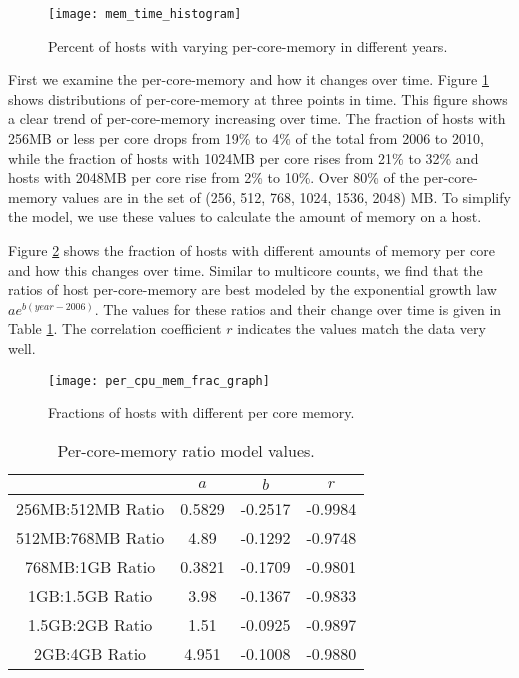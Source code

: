 \documentclass[conference]{IEEEtran}
\begin{document}
\begin{figure}[!t]
\centering
\texttt{[image: mem\_time\_histogram]}
\caption{Percent of hosts with varying per-core-memory in different years.}
\label{fig-mem-time-hist}
\end{figure}

First we examine the per-core-memory and how it changes over time.  Figure \ref{fig-mem-time-hist} shows distributions of per-core-memory at three points in time.  This figure shows a clear trend of per-core-memory increasing over time.  The fraction of hosts with 256MB or less per core drops from 19\% to 4\% of the total from 2006 to 2010, while the fraction of hosts with 1024MB per core rises from 21\% to 32\% and hosts with 2048MB per core rise from 2\% to 10\%.  Over 80\% of the per-core-memory values are in the set of (256, 512, 768, 1024, 1536, 2048) MB.  To simplify the model, we use these values to calculate the amount of memory on a host.

Figure \ref{fig-per-cpumem-frac-graph} shows the fraction of hosts with different amounts of memory per core and how this changes over time.  Similar to multicore counts, we find that the ratios of host per-core-memory are best modeled by the exponential growth law $a e^{b (year-2006)}$.  The values for these ratios and their change over time is given in Table \ref{mem-ratio-val-table}.  The correlation coefficient $r$ indicates the values match the data very well.

\begin{figure}[!t]
\centering
\texttt{[image: per\_cpu\_mem\_frac\_graph]}
\caption{Fractions of hosts with different per core memory.}
\label{fig-per-cpumem-frac-graph}
\end{figure}

\begin{table}
\caption{Per-core-memory ratio model values.}
\centering
\begin{tabular}{|c|c|c|c|}
\hline
& $a$ & $b$ & $r$ \\
\hline
256MB:512MB Ratio & 0.5829 & -0.2517 & -0.9984 \\
\hline
512MB:768MB Ratio & 4.89 & -0.1292 & -0.9748 \\
\hline
768MB:1GB Ratio & 0.3821 & -0.1709 & -0.9801 \\
\hline
1GB:1.5GB Ratio & 3.98 & -0.1367 & -0.9833 \\
\hline
1.5GB:2GB Ratio & 1.51 & -0.0925 & -0.9897 \\
\hline
2GB:4GB Ratio & 4.951 & -0.1008 & -0.9880 \\
\hline
\end{tabular}
\label{mem-ratio-val-table}
\end{table}
\end{document}
